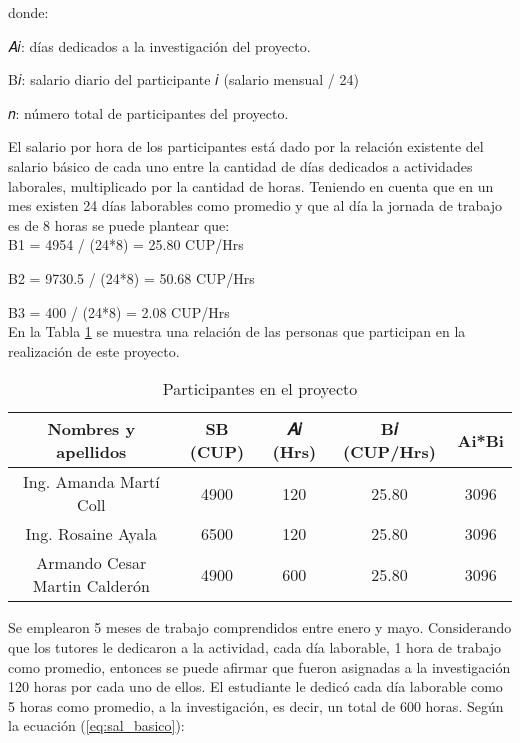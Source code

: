 donde:

𝐴𝑖: días dedicados a la investigación del proyecto.

B𝑖: salario diario del participante 𝑖 (salario mensual / 24)

𝑛: número total de participantes del proyecto.

El salario por hora de los participantes está dado por la relación existente del salario
básico de cada uno entre la cantidad de días dedicados a actividades laborales,
multiplicado por la cantidad de horas. Teniendo en cuenta que en un mes existen 24
días laborables como promedio y que al día la jornada de trabajo es de 8 horas se
puede plantear que:\\

B1 = 4954 / (24*8) = 25.80 CUP/Hrs

B2 = 9730.5 / (24*8) = 50.68 CUP/Hrs

B3 = 400 / (24*8) = 2.08 CUP/Hrs\\

En la Tabla \ref{table:participantes_proyecto} se muestra una relación de las personas que participan en la realización de este proyecto. \\


\begin{table}[H]
    \caption{Participantes en el proyecto}
    \label{table:participantes_proyecto}

    \begin{tabular}{|c|c|c|c|c|}
        \hline
        \textbf{Nombres y apellidos}  & \textbf{SB (CUP)} & \textbf{𝐴𝑖 (Hrs)} & \textbf{B𝑖 (CUP/Hrs)} & \textbf{Ai*Bi} \\
        \hline
        Ing. Amanda Martí Coll        & 4900              & 120               & 25.80                 & 3096           \\
        Ing. Rosaine Ayala            & 6500              & 120               & 25.80                 & 3096           \\
        Armando Cesar Martin Calderón & 4900              & 600               & 25.80                 & 3096           \\

        \hline
    \end{tabular}
\end{table}


Se emplearon 5 meses de trabajo comprendidos entre enero y mayo. Considerando que los tutores le dedicaron a la actividad, cada día laborable, 1 hora de trabajo como promedio, entonces se puede afirmar que fueron asignadas a la investigación 120 horas por cada uno de ellos.
El estudiante le dedicó cada día laborable como 5 horas como promedio, a la investigación, es decir, un total de 600 horas.
Según la ecuación (\ref{eq:sal_basico}):\\

